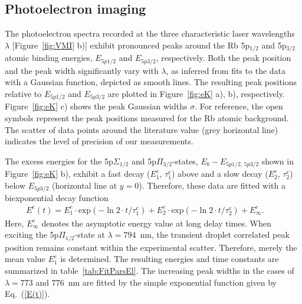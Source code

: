 \subsection{Photoelectron imaging}
\label{sec:PES}
The photoelectron spectra recorded at the three characteristic laser wavelengths $\lambda$ [Figure~\ref{fig:VMI} b)] exhibit pronounced peaks around the Rb 5p$_{1/2}$ and 5p$_{3/2}$ atomic binding energies, $E_{5p1/2}$ and $E_{5p3/2}$, respectively. Both the peak position and the peak width significantly vary with $\lambda$, as inferred from fits to the data with a Gaussian function, depicted as smooth lines. The resulting peak positions relative to $E_{5p1/2}$ and $E_{5p3/2}$ are plotted in Figure~\ref{fig:eK} a), b), respectively. Figure~\ref{fig:eK} c) shows the peak Gaussian widths $\sigma$. For reference, the open symbols represent the peak positions measured for the Rb atomic background. The scatter of data points around the literature value (grey horizontal line) indicates the level of precision of our measurements.

The excess energies for the 5p$\Sigma_{1/2}$ and 5p$\Pi_{3/2}$-states, $E_b - E_{5p1/2, \, 5p3/2}$ shown in Figure~\ref{fig:eK} b), exhibit a fast decay ($E^e_1$, $\tau^e_1$) above and a slow decay ($E^e_2$, $\tau^e_2$) below $E_{5p3/2}$ (horizontal line at $y=0$). Therefore, these data are fitted with a biexponential decay function
\begin{align} 
E^e(t)=E^e_1\cdot\mathrm{exp}(-\ln2\cdot t/\tau^e_1)+E^e_2\cdot\mathrm{exp}(-\ln2\cdot t/\tau^e_2)+E^e_{\infty}.\qquad
\label{Eel(t)}
\end{align}
Here, $E^e_\infty$ denotes the asymptotic energy value at long delay times. When exciting the 5p$\Pi_{1/2}$-state at $\lambda=794$~nm, the transient droplet correlated peak position remains constant within the experimental scatter. Therefore, merely the mean value $E^e_1$ is determined. The resulting energies and time constants are summarized in table~\ref{tab:FitParsEl}. The increasing peak widths in the cases of $\lambda=773$ and $776$~nm are fitted by the simple exponential function given by Eq.~(\ref{E(t)}). 

